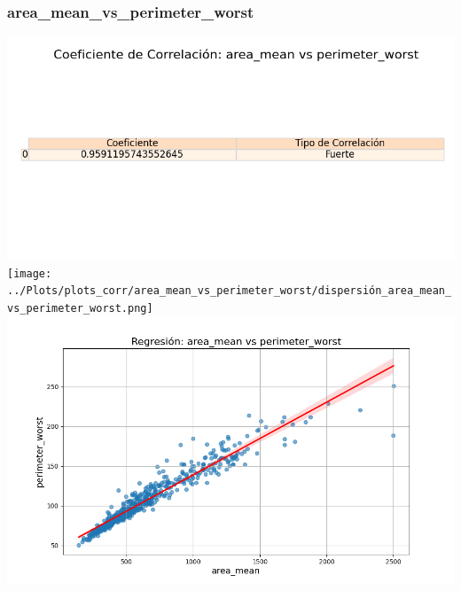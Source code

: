 \documentclass[a4paper, 12pt]{article}
\begin{document}
\subsubsection{area\_mean\_vs\_perimeter\_worst}
	\includegraphics[width = \textwidth]{../Plots/plots_corr/area_mean_vs_perimeter_worst/coeficiente_correlacion_area_mean_vs_perimeter_worst.png}
	\texttt{[image: ../Plots/plots\_corr/area\_mean\_vs\_perimeter\_worst/dispersión\_area\_mean\_vs\_perimeter\_worst.png]}
	\includegraphics[width = \textwidth]{../Plots/plots_corr/area_mean_vs_perimeter_worst/regresion_area_mean_vs_perimeter_worst.png}
\end{document}
